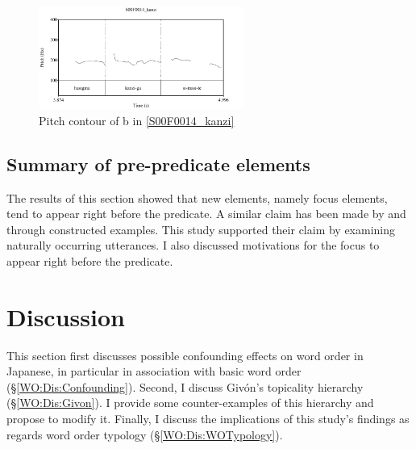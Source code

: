 \begin{figure}
	\begin{center}
	\includegraphics[width=0.6\textwidth]{sounds/S00F0014_kanzi.pdf}
	\caption{Pitch contour of b in \ref{S00F0014_kanzi}}
	\label{S00F0014_kanziF}
	\end{center}
\end{figure}

\subsection{Summary of pre-predicate elements}

The results of this section showed that
new elements, namely focus elements, tend to appear right before the predicate.
A similar claim has been made by  and 
through constructed examples.
This study supported their claim by examining naturally occurring utterances.
I also discussed motivations for the focus to appear right before the predicate.

\section{Discussion}\label{WODiscussion}

This section first discusses possible confounding effects on word order in Japanese,
in particular in association with basic word order (\S \ref{WO:Dis:Confounding}).
Second,
I discuss Giv{\'{o}}n's topicality hierarchy (\S \ref{WO:Dis:Givon}).
I provide some counter-examples of this hierarchy and
propose to modify it.
Finally, 
I discuss the implications of this study's findings as regards word order typology (\S \ref{WO:Dis:WOTypology}).



